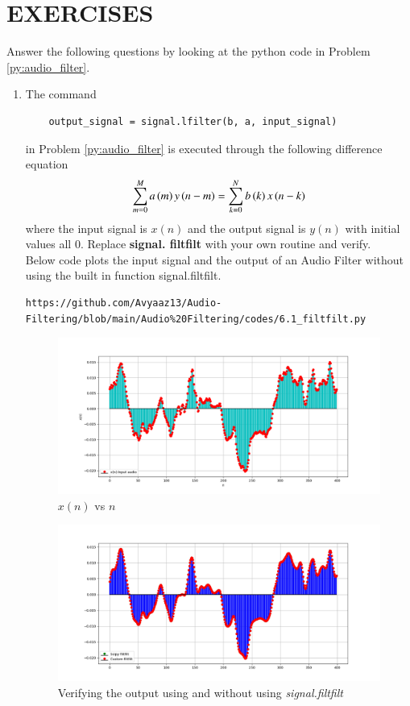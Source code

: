 \documentclass[journal,12pt,twocolumn]{IEEEtran}
\theoremstyle{remark}
\renewcommand\thesection{\arabic{section}}
\numberwithin{equation}{subsection}
\begin{document}
\section{\textbf{EXERCISES}}
\noindent Answer the following questions by looking at the python code in Problem \ref{py:audio_filter}.
\begin{enumerate}[label=\thesection.\arabic*]
\item
The command
\begin{lstlisting}
	output_signal = signal.lfilter(b, a, input_signal)
	\end{lstlisting}
in Problem \ref{py:audio_filter} is executed through the following difference equation
\begin{equation}
\label{eq:iir_filter_gen}
 \sum _{m=0}^{M}a\left(m\right)y\left(n-m\right)=\sum _{k=0}^{N}b\left(k\right)x\left(n-k\right) 
\end{equation}
%
where the input signal is $x(n)$ and the output signal is $y(n)$ with initial values all 0. Replace
\textbf{signal. filtfilt} with your own routine and verify.\\

\solution Below code plots the input signal and the output of an Audio Filter without using the built in function signal.filtfilt.

\begin{lstlisting}
https://github.com/Avyaaz13/Audio-Filtering/blob/main/Audio%20Filtering/codes/6.1_filtfilt.py
\end{lstlisting}
\begin{figure}[!ht]
\centering
\includegraphics[width=1.2\columnwidth]{figs/xn_custom.png}
\caption{$x(n)$ vs $n$}
\label{fig:x(n) vs n}
\end{figure}

\begin{figure}[!ht]
\centering
\includegraphics[width=1.2\columnwidth]{figs/Figure_1.png}
\caption{Verifying the output using and without using {\em signal.filtfilt}}
\label{fig:6.1}
\end{figure}


\end{enumerate}
\end{document}
